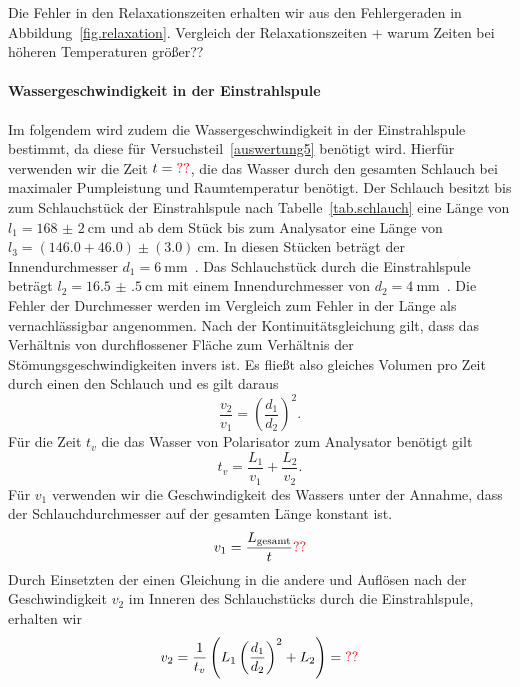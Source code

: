\documentclass[paper=a4,
	fontsize=10pt,
	DIV=18,
	twocolumn,
	parskip=half
	]{scrartcl}
\numberwithin{equation}{section}    %
\newcommand{\note}[1]{{\color{red}#1??}}
\begin{document}
Die Fehler in den Relaxationszeiten erhalten wir aus den Fehlergeraden in Abbildung~\ref{fig.relaxation}. \note{Vergleich der Relaxationszeiten + warum Zeiten bei höheren Temperaturen größer}

\paragraph*{Wassergeschwindigkeit in der Einstrahlspule}
Im folgendem wird zudem die Wassergeschwindigkeit in der Einstrahlspule bestimmt, da diese für Versuchsteil~\ref{auswertung5} benötigt wird.
Hierfür verwenden wir die Zeit $t=\note{}$, die das Wasser durch den gesamten Schlauch bei maximaler Pumpleistung und Raumtemperatur benötigt. 
Der Schlauch besitzt bis zum Schlauchstück der Einstrahlspule nach Tabelle~\ref{tab.schlauch} eine Länge von $l_1 = \SI{168(2)}{\centi\meter}$ und ab dem Stück bis zum Analysator eine Länge von $l_3 = (146.0+46.0)\pm(3.0)\SI{}{\centi\meter}$. In diesen Stücken beträgt der Innendurchmesser $d_1 = \SI{6}{\milli\meter}$~\citep{anleitung}. Das Schlauchstück durch die Einstrahlspule beträgt $l_2 = \SI{16.5(5)}{\centi\meter}$ mit einem Innendurchmesser von $d_2 = \SI{4}{\milli\meter}$~\citep{anleitung}. Die Fehler der Durchmesser werden im Vergleich zum Fehler in der Länge als vernachlässigbar angenommen. 
Nach der Kontinuitätsgleichung gilt, dass das Verhältnis von durchflossener Fläche zum Verhältnis der Stömungsgeschwindigkeiten invers ist. Es fließt also gleiches Volumen pro Zeit durch einen den Schlauch und es gilt daraus
\begin{equation}
	\frac{v_2}{v_1} = \left(\frac{d_1}{d_2}\right)^2.
\end{equation}
Für die Zeit $t_v$ die das Wasser von Polarisator zum Analysator benötigt gilt
\begin{equation}
	t_v = \frac{L_1}{v_1} + \frac{L_2}{v_2}.
\end{equation}
Für $v_1$ verwenden wir die Geschwindigkeit des Wassers unter der Annahme, dass der Schlauchdurchmesser auf der gesamten Länge konstant ist.
\begin{equation}
	v_1 = \frac{L_{\rm gesamt}}{t} \note{}
\end{equation}
Durch Einsetzten der einen Gleichung in die andere und Auflösen nach der Geschwindigkeit $v_2$ im Inneren des Schlauchstücks durch die Einstrahlspule, erhalten wir
\begin{equation}
	v_2 = \frac{1}{t_v}\left( L_1 \left( \frac{d_1}{d_2} \right)^2 + L_2\right) = \note{}
\end{equation}
\end{document}
